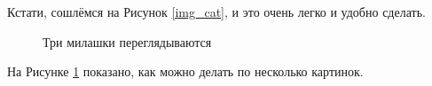 \documentclass[a4paper, 12pt]{article}
\begin{document}
Кстати, сошлёмся на Рисунок \ref{img_cat}, и это очень легко и удобно сделать.
\begin{figure}[h]
    \begin{minipage}[h]{0.5\linewidth}
    \end{minipage}
    \begin{minipage}[h]{0.5\linewidth}
    \end{minipage}
    \caption{\label{img_cute}Три милашки переглядываются}
\end{figure}

На Рисунке \ref{img_cute} показано, как можно делать по несколько картинок.
\end{document}
